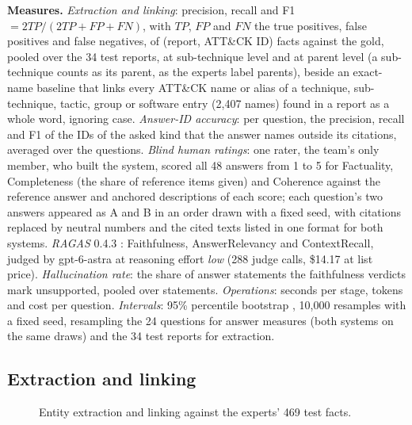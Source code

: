 \documentclass[conference,letterpaper]{IEEEtran}
\begin{document}
\textbf{Measures.} \emph{Extraction and linking}: precision, recall and F1 $= 2TP/(2TP+FP+FN)$, with $TP$, $FP$ and $FN$ the true positives, false positives and false negatives, of (report, ATT\&CK ID) facts against the gold, pooled over the 34 test reports, at sub-technique level and at parent level (a sub-technique counts as its parent, as the experts label parents), beside an exact-name baseline that links every ATT\&CK name or alias of a technique, sub-technique, tactic, group or software entry (2,407 names) found in a report as a whole word, ignoring case. \emph{Answer-ID accuracy}: per question, the precision, recall and F1 of the IDs of the asked kind that the answer names outside its citations, averaged over the questions. \emph{Blind human ratings}: one rater, the team's only member, who built the system, scored all 48 answers from 1 to 5 for Factuality, Completeness (the share of reference items given) and Coherence against the reference answer and anchored descriptions of each score; each question's two answers appeared as A and B in an order drawn with a fixed seed, with citations replaced by neutral numbers and the cited texts listed in one format for both systems. \emph{RAGAS} 0.4.3 \cite{es2024}: Faithfulness, AnswerRelevancy and ContextRecall, judged by gpt-6-astra at reasoning effort \emph{low} (288 judge calls, \$14.17 at list price). \emph{Hallucination rate}: the share of answer statements the faithfulness verdicts mark unsupported, pooled over statements. \emph{Operations}: seconds per stage, tokens and cost per question. \emph{Intervals}: 95\% percentile bootstrap \cite{efron1993}, 10,000 resamples with a fixed seed, resampling the 24 questions for answer measures (both systems on the same draws) and the 34 test reports for extraction.

\subsection{Extraction and linking}
\begin{figure}[t]\centering
{}
\caption{Entity extraction and linking against the experts' 469 test facts.}\label{fig:extraction}
\end{figure}
\end{document}
